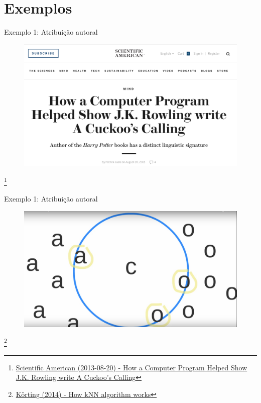 \documentclass{beamer}
\newcommand\blfootnote[1]{%
  \begingroup
  \renewcommand\thefootnote{}\footnote{#1}%
  \addtocounter{footnote}{-1}%
  \endgroup
}
\begin{document}
\section{Exemplos}
\begin{frame}{Exemplo 1: Atribuição autoral}
\begin{figure}
\includegraphics[scale=0.3]{jkrolling}
\end{figure}
\blfootnote{\tiny{\href{https://www.scientificamerican.com/article/how-a-computer-program-helped-show-jk-rowling-write-a-cuckoos-calling/}{Scientific American (2013-08-20) - How a Computer Program Helped Show J.K. Rowling write A Cuckoo’s Calling}}}
\end{frame}

\begin{frame}{Exemplo 1: Atribuição autoral}
\begin{figure}
\includegraphics[scale=0.2]{knn}
\end{figure}
\blfootnote{\tiny{\href{https://www.youtube.com/watch?v=UqYde-LULfs}{Körting (2014) - How kNN algorithm works}}}
\end{frame}
\end{document}
